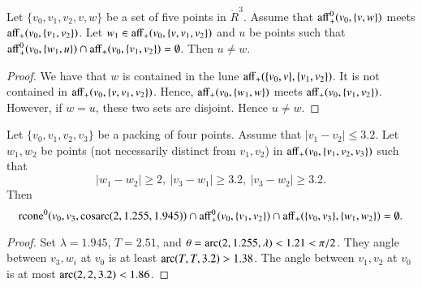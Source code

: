 \begin{tarskidata}
\begin{tarski}
\begin{lemma}
Let $\{v_0,v_1,v_2,v,w\}$ be a set of five points in $\ring{R}^3$.
Assume that ${\operatorname{aff}}_+^0(v_0,\{v,w\})$ meets ${\operatorname{aff}}_+(v_0,\{v_1,v_2\})$.
Let $w_1\in {\operatorname{aff}}_+(v_0,\{v,v_1,v_2\})$ and $u$ be points such
that ${\operatorname{aff}}_+^0(v_0,\{w_1,u\})\cap {\operatorname{aff}}_+(v_0,\{v_1,v_2\})=\emptyset$.
Then $u\ne w$.
\end{lemma}

\begin{proof} 
We have that $w$ is contained in the lune ${\operatorname{aff}}_+(\{v_0,v\},\{v_1,v_2\})$.
It is not contained in ${\operatorname{aff}}_+(v_0,\{v,v_1,v_2\})$.  Hence,
${\operatorname{aff}}_+(v_0,\{w_1,w\})$ meets ${\operatorname{aff}}_+(v_0,\{v_1,v_2\})$.  However,
if $w=u$, these two sets are disjoint.  Hence $u\ne w$.
\end{proof}
\end{tarski}



\begin{tarski}

\begin{lemma}
Let $\{v_0,v_1,v_2,v_3\}$ be a packing of four points.
Assume that $|v_1-v_2|\le 3.2$.  Let $w_1,w_2$ be points (not necessarily
distinct from $v_1,v_2$)
in ${\operatorname{aff}}_+(v_0,\{v_1,v_2,v_3\})$ such that
  $$|w_1-w_2|\ge 2,\ |v_3-w_1|\ge 3.2,\ |v_3-w_2|\ge 3.2.
  $$
Then 
  $${\operatorname{rcone}}^0(v_0,v_3,\operatorname{cosarc}(2,1.255,1.945)) \cap {\operatorname{aff}}_+^0(v_0,\{v_1,v_2\})
  \cap {\operatorname{aff}}_+(\{v_0,v_3\},\{w_1,w_2\})
=\emptyset .
  $$
\end{lemma}


\begin{proof}
Set $\lambda=1.945$, $T=2.51$, and
    $\theta = \operatorname{arc}(2,1.255,\lambda)< 1.21 <\pi/2$.  
They angle between $v_3,w_i$ at $v_0$ is at least
$\operatorname{arc}(T,T,3.2)>1.38$. The angle between
$v_1,v_2$ at $v_0$ is at most
$\operatorname{arc}(2,2,3.2)<1.86$.


\end{proof}
\end{tarski}
\end{tarskidata}
